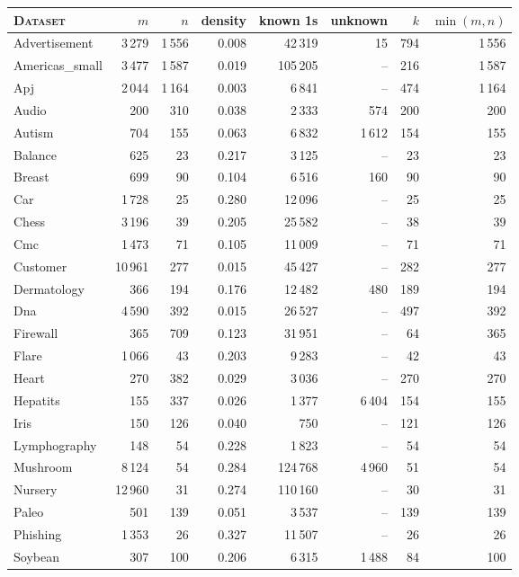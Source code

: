 \begin{table}[t]
\centering
\scriptsize
\setlength{\tabcolsep}{3pt}
\begin{tabular}{l rrrrrrr}
\toprule
\textsc{Dataset} & $m$ & $n$ & density & known 1s & unknown & $k$ & $\min(m,n)$ \\
\midrule
Advertisement & 3\,279 & 1\,556 & 0.008 & 42\,319 & 15 & 794 & 1\,556 \\
Americas\_small & 3\,477 & 1\,587 & 0.019 & 105\,205 & -- & 216 & 1\,587 \\
Apj & 2\,044 & 1\,164 & 0.003 & 6\,841 & -- & 474 & 1\,164 \\
Audio & 200 & 310 & 0.038 & 2\,333 & 574 & 200 & 200 \\
Autism & 704 & 155 & 0.063 & 6\,832 & 1\,612 & 154 & 155 \\
Balance & 625 & 23 & 0.217 & 3\,125 & -- & 23 & 23 \\
Breast & 699 & 90 & 0.104 & 6\,516 & 160 & 90 & 90 \\
Car & 1\,728 & 25 & 0.280 & 12\,096 & -- & 25 & 25 \\
Chess & 3\,196 & 39 & 0.205 & 25\,582 & -- & 38 & 39 \\
Cmc & 1\,473 & 71 & 0.105 & 11\,009 & -- & 71 & 71 \\
Customer & 10\,961 & 277 & 0.015 & 45\,427 & -- & 282 & 277 \\
Dermatology & 366 & 194 & 0.176 & 12\,482 & 480 & 189 & 194 \\
Dna & 4\,590 & 392 & 0.015 & 26\,527 & -- & 497 & 392 \\
Firewall & 365 & 709 & 0.123 & 31\,951 & -- & 64 & 365 \\
Flare & 1\,066 & 43 & 0.203 & 9\,283 & -- & 42 & 43 \\
Heart & 270 & 382 & 0.029 & 3\,036 & -- & 270 & 270 \\
Hepatits & 155 & 337 & 0.026 & 1\,377 & 6\,404 & 154 & 155 \\
Iris & 150 & 126 & 0.040 & 750 & -- & 121 & 126 \\
Lymphography & 148 & 54 & 0.228 & 1\,823 & -- & 54 & 54 \\
Mushroom & 8\,124 & 54 & 0.284 & 124\,768 & 4\,960 & 51 & 54 \\
Nursery & 12\,960 & 31 & 0.274 & 110\,160 & -- & 30 & 31 \\
Paleo & 501 & 139 & 0.051 & 3\,537 & -- & 139 & 139 \\
Phishing & 1\,353 & 26 & 0.327 & 11\,507 & -- & 26 & 26 \\
Soybean & 307 & 100 & 0.206 & 6\,315 & 1\,488 & 84 & 100 \\

\end{tabular}
\end{table}

